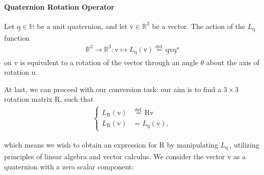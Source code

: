 \paragraph{Quaternion Rotation Operator} Let $\underline{\bm{\mathrm{q}}}\in\mathbb{H}$ be a unit quaternion, and let $\bm{\mathrm{v}}\in\mathbb{R}^3$ be a vector. The action of the $L_{\underline{\bm{\mathrm{q}}}}$ function 
\begin{align*}
	\mathbb{R}^3\rightarrow\mathbb{R}^3:\bm{\mathrm{v}}\mapsto L_{\underline{\bm{\mathrm{q}}}}(\bm{\mathrm{v}}) \stackrel{\text{def.}}{=} \underline{\bm{\mathrm{q}}}\bm{\mathrm{v}}\underline{\bm{\mathrm{q}}}^\star
\end{align*}
on $\bm{\mathrm{v}}$ is equivalent to a rotation of the vector through an angle $\theta$ about the axis of rotation $\bm{\mathrm{u}}$.

\setlength{\belowdisplayskip}{0.3cm}

\bigskip At last, we can proceed with our conversion task: our aim is to find a $3\times3$ rotation matrix $\bm{\mathrm{R}}$, such that
\begin{align*}
\left\{
    \begin{aligned}
    	L_{\bm{\mathrm{R}}}(\bm{\mathrm{v}}) &\stackrel{\text{def.}}{=} \bm{\mathrm{R}}\bm{\mathrm{v}} \\
        L_{\bm{\mathrm{R}}}(\bm{\mathrm{v}}) &= L_{\underline{\bm{\mathrm{q}}}}(\bm{\mathrm{v}}),
    \end{aligned}
\right.
\end{align*}

which means we wish to obtain an expression for $\bm{\mathrm{R}}$ by manipulating $L_{\underline{\bm{\mathrm{q}}}}\,$, utilizing principles of linear algebra and vector calculus. We consider the vector $\bm{\mathrm{v}}$ as a quaternion with a zero scalar component:


